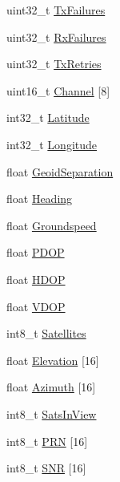 \begin{DoxyCompactItemize}
uint32\-\_\-t \hyperlink{struct____attribute_____a7e11955ae1b84dd63bb54eddcbd180cc}{\-Tx\-Failures}
\item 
uint32\-\_\-t \hyperlink{struct____attribute_____a88917b8950e17f24e5b6affa3c2c3189}{\-Rx\-Failures}
\item 
uint32\-\_\-t \hyperlink{struct____attribute_____a737757725531fcd0ea9353c2efd9e559}{\-Tx\-Retries}
\item 
uint16\-\_\-t \hyperlink{struct____attribute_____a4a2ecbc7c452e50c571f77956cbe7f31}{\-Channel} \mbox{[}8\mbox{]}
\item 
int32\-\_\-t \hyperlink{struct____attribute_____aef9cee564e5ce4cb3d5e9bc5041b20fa}{\-Latitude}
\item 
int32\-\_\-t \hyperlink{struct____attribute_____a62a5344a3012ae4a6b572825cc0431e1}{\-Longitude}
\item 
float \hyperlink{struct____attribute_____a1b01d6f27599d171369372ef997520c9}{\-Geoid\-Separation}
\item 
float \hyperlink{struct____attribute_____ac99daf96bcd9b7ed3893d53c1c78ac9d}{\-Heading}
\item 
float \hyperlink{struct____attribute_____a2964b1145bc1ce85e4c33999f7a2dee5}{\-Groundspeed}
\item 
float \hyperlink{struct____attribute_____af13bd232120103c70e82ac674c3bf0ac}{\-P\-D\-O\-P}
\item 
float \hyperlink{struct____attribute_____acf74a4cdfbd52d12ca025ebd12b9b5fc}{\-H\-D\-O\-P}
\item 
float \hyperlink{struct____attribute_____af59be15fc3bec008a580afde48410a08}{\-V\-D\-O\-P}
\item 
int8\-\_\-t \hyperlink{struct____attribute_____a78f0a91a8b03a42479f9222fa6173fb2}{\-Satellites}
\item 
float \hyperlink{struct____attribute_____a4406262a239d19bd6ed0eadd427c2bbb}{\-Elevation} \mbox{[}16\mbox{]}
\item 
float \hyperlink{struct____attribute_____a70fc868ad4e4068426d332b8eacfbd6f}{\-Azimuth} \mbox{[}16\mbox{]}
\item 
int8\-\_\-t \hyperlink{struct____attribute_____a326e9a329a899d5fcabc1c4d58ccb26b}{\-Sats\-In\-View}
\item 
int8\-\_\-t \hyperlink{struct____attribute_____a8f93fcaaf736f28d0aa0b666d598af02}{\-P\-R\-N} \mbox{[}16\mbox{]}
\item 
int8\-\_\-t \hyperlink{struct____attribute_____a3f0e0b6367f05118c1859622222fa08f}{\-S\-N\-R} \mbox{[}16\mbox{]}
\item 

\end{DoxyCompactItemize}
